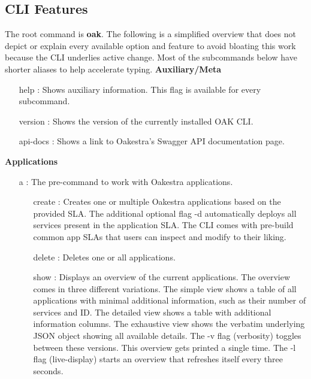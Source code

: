 \subsection{CLI Features}

The root command is \textbf{oak}.
The following is a simplified overview that does not depict or explain every available option and feature to avoid bloating this work because the CLI underlies active change.
Most of the subcommands below have shorter aliases to help accelerate typing.
\vspace{5mm}
\newline
\textbf{Auxiliary/Meta}
\begin{itemize}
    \item [help]:
        Shows auxiliary information.
        This flag is available for every subcommand.
    \item [version]:
        Shows the version of the currently installed OAK CLI.
    \item [api-docs]:
        Shows a link to Oakestra's Swagger API documentation page.
\end{itemize}
\vspace{5mm}
\textbf{Applications}
\begin{itemize}
    \item [a]:
        The pre-command to work with Oakestra applications.
        \begin{itemize}
            \item [create]:
                Creates one or multiple Oakestra applications based on the provided SLA.
                The additional optional flag -d automatically deploys all services present in the application SLA.
                The CLI comes with pre-build common app SLAs that users can inspect and modify to their liking.
            \item [delete]:
                Deletes one or all applications.
            \item [show]:
            Displays an overview of the current applications.
            The overview comes in three different variations.
            The simple view shows a table of all applications with minimal additional information, such as their number of services and ID.
            The detailed view shows a table with additional information columns.
            The exhaustive view shows the verbatim underlying JSON object showing all available details.
            The -v flag (verbosity) toggles between these versions.
            This overview gets printed a single time.
            The -l flag (live-display) starts an overview that refreshes itself every three seconds.
        \end{itemize}
\end{itemize}
